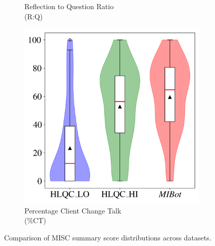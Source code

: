 \begin{figure}[htpb!]
\begin{subfigure}[b]{0.32\textwidth}
        \caption{Reflection to Question Ratio \\(R:Q)}
        \label{fig:rq}
    \end{subfigure}
    \hfill
    \begin{subfigure}[b]{0.32\textwidth}
        \centering
        \includegraphics[width=\textwidth]{fig/ct.png}
        \caption{Percentage Client Change Talk \\(\%CT)}
        \label{fig:ct}
    \end{subfigure}
    \caption{Comparison of MISC summary score distributions across datasets.}
    \captionsetup{justification=justified}
    \label{fig:violin_box_plots}
\end{figure}


